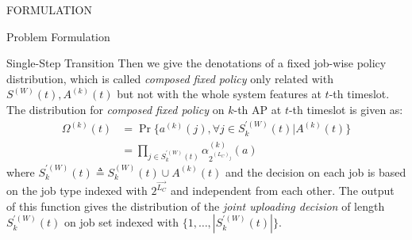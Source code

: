 \documentclass[10pt, conference, letterpaper]{IEEEtran}
\begin{document}
\begin{section}{FORMULATION}
\begin{subsection}{Problem Formulation}
\begin{subsubsection}{Single-Step Transition}
                Then we give the denotations of a fixed job-wise policy distribution, which is called \emph{composed fixed policy} only related with $S^{(W)}(t), A^{(k)}(t)$ but not with the whole system features at $t$-th timeslot. The distribution for \emph{composed fixed policy} on $k$-th AP at $t$-th timeslot is given as:
                \begin{align}
                    \Omega^{(k)}(t) &= \Pr\{a^{(k)}(j), \forall j \in S^{'(W)}_k(t) | A^{(k)}(t)\}
                    \nonumber\\
                    &= \prod_{j \in S^{'(W)}_k(t)} \alpha_{2^{(L_C)_j}}^{(k)}(a)
                \end{align}
                where $S^{'(W)}_k(t) \triangleq S^{(W)}_k(t) \cup A^{(k)}(t)$ and the decision on each job is based on the job type indexed with $2^{\vec{L_C}}$ and independent from each other. The output of this function gives the distribution of the \emph{joint uploading decision} of length $S^{'(W)}_k(t)$ on job set indexed with $\{1,\dots,|S^{'(W)}_k(t)|\}$.


\end{subsubsection}
\end{subsection}
\end{section}
\end{document}
